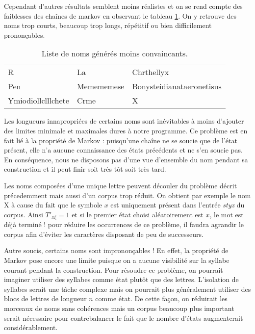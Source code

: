 \documentclass[12pt]{article}
\begin{document}
Cependant d'autres résultats semblent moins réalistes et on se rend
compte des faiblesses des chaînes de markov en observant le tableau
\ref{pasbons}. On y retrouve des noms trop courts, beaucoup trop
longs, répétitif ou bien difficilement prononçables.

\begin{table}[H]
  \centering

  \begin{tabular}{l|l|l}
    R & La & Chrthellyx \\
    Pen & Memememese & Bonysteidianataeronetisus \\
    Ymiodiollclllchete & Crme & X
  \end{tabular}

  \caption{Liste de noms générés moins convaincants.}
  \label{pasbons}

\end{table}

Les longueurs innapropriées de certains noms sont inévitables à moins
d'ajouter des limites minimale et maximales dures à notre
programme. Ce problème est en fait lié à la propriété de Markov :
puisqu'une chaîne ne se soucie que de l'état présent, elle n'a aucune
connaissance des états précédents et ne s'en soucie pas. En
conséquence, nous ne disposons pas d'une vue d'ensemble du nom pendant
sa construction et il peut finir soit très tôt soit très tard.

Les noms composées d'une unique lettre peuvent découler du problème
décrit précedemment mais aussi d'un corpus trop réduit. On obtient par
exemple le nom X à cause du fait que le symbole $x$ est uniquement
présent dans l'entrée \textit{styx} du corpus. Ainsi ${T'}_{x\xi} = 1$
et si le premier état choisi aléatoirement est $x$, le mot est déjà
terminé ! pour réduire les occurrences de ce problème, il faudra
agrandir le corpus afin d'éviter les caractères disposant de peu
de successeurs.

Autre soucis, certains noms sont imprononçables ! En effet, la
propriété de Markov pose encore une limite puisque on a aucune
visibilité sur la syllabe courant pendant la construction. Pour
résoudre ce problème, on pourrait imaginer utiliser des syllabes comme
état plutôt que des lettres. L'isolation de syllabes serait une tâche
complexe mais on pourrait plus généralement utiliser des blocs de
lettres de longueur $n$ comme état. De cette façon, on réduirait les
morceaux de noms sans cohérences mais un corpus beaucoup plus
important serait nécessaire pour contrebalancer le fait que le nombre
d'états augmenterait considérablement.



\end{document}
